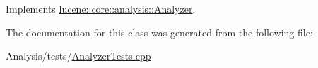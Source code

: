 Implements \mbox{\hyperlink{classlucene_1_1core_1_1analysis_1_1Analyzer_a9b7dc3c598057fbf4e9b5f48066cb54a}{lucene\+::core\+::analysis\+::\+Analyzer}}.



The documentation for this class was generated from the following file\+:\begin{DoxyCompactItemize}
\item 
Analysis/tests/\mbox{\hyperlink{AnalyzerTests_8cpp}{Analyzer\+Tests.\+cpp}}\end{DoxyCompactItemize}
